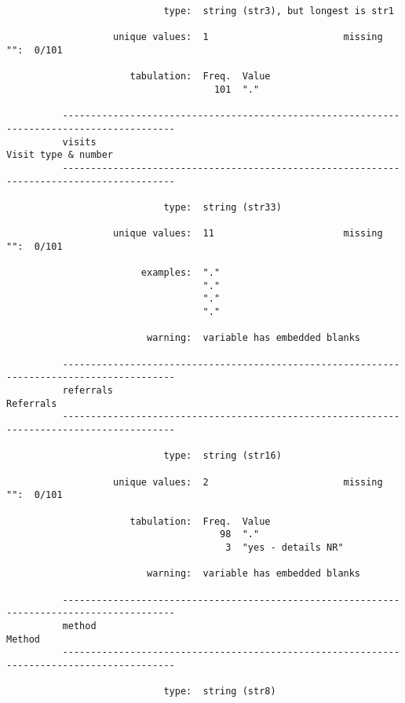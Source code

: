 \documentclass{article}
\begin{document}
\begin{verbatim}
                            type:  string (str3), but longest is str1
          
                   unique values:  1                        missing "":  0/101
          
                      tabulation:  Freq.  Value
                                     101  "."
          
          ------------------------------------------------------------------------------------------
          visits                                                                 Visit type & number
          ------------------------------------------------------------------------------------------
          
                            type:  string (str33)
          
                   unique values:  11                       missing "":  0/101
          
                        examples:  "."
                                   "."
                                   "."
                                   "."
          
                         warning:  variable has embedded blanks
          
          ------------------------------------------------------------------------------------------
          referrals                                                                        Referrals
          ------------------------------------------------------------------------------------------
          
                            type:  string (str16)
          
                   unique values:  2                        missing "":  0/101
          
                      tabulation:  Freq.  Value
                                      98  "."
                                       3  "yes - details NR"
          
                         warning:  variable has embedded blanks
          
          ------------------------------------------------------------------------------------------
          method                                                                              Method
          ------------------------------------------------------------------------------------------
          
                            type:  string (str8)
          

\end{verbatim}
\end{document}
